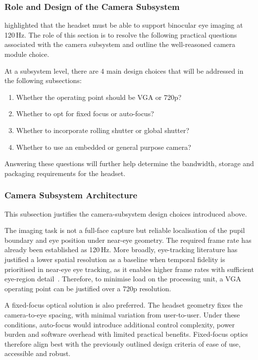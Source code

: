 \subsubsection{Role and Design of the Camera Subsystem}

 highlighted that the headset must be able to support binocular eye imaging at 120\,Hz. The role of this section is to resolve the following practical questions associated with the camera subsystem and outline the well-reasoned camera module choice.

At a subsystem level, there are 4 main design choices that will be addressed in the following subsections:

\begin{enumerate}
    \item Whether the operating point should be VGA or 720p?
    \item Whether to opt for fixed focus or auto-focus?
    \item Whether to incorporate rolling shutter or global shutter?
    \item Whether to use an embedded or general purpose camera?
\end{enumerate}

Answering these questions will further help determine the bandwidth, storage and packaging requirements for the headset.

\subsubsection{Camera Subsystem Architecture}

This subsection justifies the camera-subsystem design choices introduced above.

The imaging task is not a full-face capture but reliable localisation of the pupil boundary and eye position under near-eye geometry. The required frame rate has already been established as 120\,Hz. More broadly, eye-tracking literature has justified a lower spatial resolution as a baseline when temporal fidelity is prioritised in near-eye eye tracking, as it enables higher frame rates with sufficient eye-region detail~\cite{morimoto2005eye, chugh2020eye}. Therefore, to minimise load on the processing unit, a VGA operating point can be justified over a 720p resolution.

A fixed-focus optical solution is also preferred. The headset geometry fixes the camera-to-eye spacing, with minimal variation from user-to-user. Under these conditions, auto-focus would introduce additional control complexity, power burden and software overhead with limited practical benefits. Fixed-focus optics therefore align best with the previously outlined design criteria of ease of use, accessible and robust.

